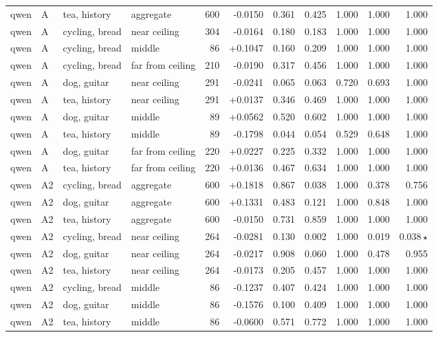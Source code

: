 \begin{center}
\begin{longtable}{llllrrrrrrr}
qwen & A & tea, history & aggregate & 600 & -0.0150 & 0.361 & 0.425 & 1.000 & 1.000 & 1.000 \\
qwen & A & cycling, bread & near ceiling & 304 & -0.0164 & 0.180 & 0.183 & 1.000 & 1.000 & 1.000 \\
qwen & A & cycling, bread & middle & 86 & +0.1047 & 0.160 & 0.209 & 1.000 & 1.000 & 1.000 \\
qwen & A & cycling, bread & far from ceiling & 210 & -0.0190 & 0.317 & 0.456 & 1.000 & 1.000 & 1.000 \\
qwen & A & dog, guitar & near ceiling & 291 & -0.0241 & 0.065 & 0.063 & 0.720 & 0.693 & 1.000 \\
qwen & A & tea, history & near ceiling & 291 & +0.0137 & 0.346 & 0.469 & 1.000 & 1.000 & 1.000 \\
qwen & A & dog, guitar & middle & 89 & +0.0562 & 0.520 & 0.602 & 1.000 & 1.000 & 1.000 \\
qwen & A & tea, history & middle & 89 & -0.1798 & 0.044 & 0.054 & 0.529 & 0.648 & 1.000 \\
qwen & A & dog, guitar & far from ceiling & 220 & +0.0227 & 0.225 & 0.332 & 1.000 & 1.000 & 1.000 \\
qwen & A & tea, history & far from ceiling & 220 & +0.0136 & 0.467 & 0.634 & 1.000 & 1.000 & 1.000 \\
qwen & A2 & cycling, bread & aggregate & 600 & +0.1818 & 0.867 & 0.038 & 1.000 & 0.378 & 0.756 \\
qwen & A2 & dog, guitar & aggregate & 600 & +0.1331 & 0.483 & 0.121 & 1.000 & 0.848 & 1.000 \\
qwen & A2 & tea, history & aggregate & 600 & -0.0150 & 0.731 & 0.859 & 1.000 & 1.000 & 1.000 \\
qwen & A2 & cycling, bread & near ceiling & 264 & -0.0281 & 0.130 & 0.002 & 1.000 & 0.019 & 0.038\,$\star$ \\
qwen & A2 & dog, guitar & near ceiling & 264 & -0.0217 & 0.908 & 0.060 & 1.000 & 0.478 & 0.955 \\
qwen & A2 & tea, history & near ceiling & 264 & -0.0173 & 0.205 & 0.457 & 1.000 & 1.000 & 1.000 \\
qwen & A2 & cycling, bread & middle & 86 & -0.1237 & 0.407 & 0.424 & 1.000 & 1.000 & 1.000 \\
qwen & A2 & dog, guitar & middle & 86 & -0.1576 & 0.100 & 0.409 & 1.000 & 1.000 & 1.000 \\
qwen & A2 & tea, history & middle & 86 & -0.0600 & 0.571 & 0.772 & 1.000 & 1.000 & 1.000 \\

\end{longtable}
\end{center}
